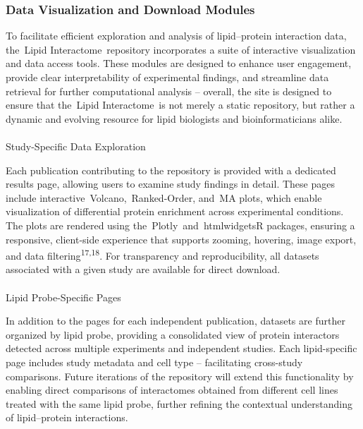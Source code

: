 \documentclass[
  letterpaper,
  DIV=11,
  numbers=noendperiod]{scrartcl}
\makeatletter
\let\oldparagraph\paragraph
\renewcommand{\paragraph}{
    \@ifstar
      \xxxParagraphStar
      \xxxParagraphNoStar
  }
\newcommand{\xxxParagraphStar}[1]{\oldparagraph*{#1}\mbox{}}
\newcommand{\xxxParagraphNoStar}[1]{\oldparagraph{#1}\mbox{}}
\makeatother
\begin{document}
\subsubsection{Data Visualization and Download
Modules}\label{data-visualization-and-download-modules}

To facilitate efficient exploration and analysis of lipid--protein
interaction data, the~Lipid Interactome~repository incorporates a suite
of interactive visualization and data access tools. These modules are
designed to enhance user engagement, provide clear interpretability of
experimental findings, and streamline data retrieval for further
computational analysis -- overall, the site is designed to ensure that
the~Lipid Interactome~is not merely a static repository, but rather a
dynamic and evolving resource for lipid biologists and bioinformaticians
alike.

\paragraph{Study-Specific Data
Exploration}\label{study-specific-data-exploration}

Each publication contributing to the repository is provided with a
dedicated results page, allowing users to examine study findings in
detail. These pages include interactive~Volcano,~Ranked-Order, and~MA
plots, which enable visualization of differential protein enrichment
across experimental conditions. The plots are rendered using
the~Plotly~and~htmlwidgetsR packages, ensuring a responsive, client-side
experience that supports zooming, hovering, image export, and data
filtering\textsuperscript{17,18}. For transparency and reproducibility,
all datasets associated with a given study are available for direct
download.

\paragraph{Lipid Probe-Specific Pages}\label{lipid-probe-specific-pages}

In addition to the pages for each independent publication, datasets are
further organized by lipid probe, providing a consolidated view of
protein interactors detected across multiple experiments and independent
studies. Each lipid-specific page includes study metadata and cell type
-- facilitating cross-study comparisons. Future iterations of the
repository will extend this functionality by enabling direct comparisons
of interactomes obtained from different cell lines treated with the same
lipid probe, further refining the contextual understanding of
lipid--protein interactions.
\end{document}
